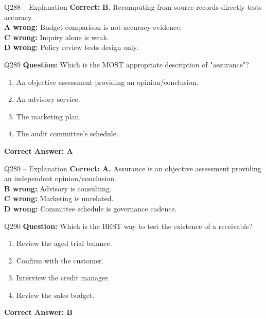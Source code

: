 \documentclass[aspectratio=169,10pt]{beamer}
\begin{document}
	\begin{frame}[t]{Q288 -- Explanation}
		\small
		\textbf{Correct: B.} Recomputing from source records directly tests accuracy. \\[4pt]
		\textbf{A wrong:} Budget comparison is not accuracy evidence. \\[2pt]
		\textbf{C wrong:} Inquiry alone is weak. \\[2pt]
		\textbf{D wrong:} Policy review tests design only.
	\end{frame}
	
	\begin{frame}[t]{Q289}
		\small
		\textbf{Question:} Which is the MOST appropriate description of "assurance"?
		\begin{enumerate}[label=\Alph*.,itemsep=1pt,topsep=2pt]
			\item An objective assessment providing an opinion/conclusion.
			\item An advisory service.
			\item The marketing plan.
			\item The audit committee's schedule.
		\end{enumerate}
		\vspace{4pt}
		\textbf{Correct Answer: A}
	\end{frame}
	
	\begin{frame}[t]{Q289 -- Explanation}
		\small
		\textbf{Correct: A.} Assurance is an objective assessment providing an independent opinion/conclusion. \\[4pt]
		\textbf{B wrong:} Advisory is consulting. \\[2pt]
		\textbf{C wrong:} Marketing is unrelated. \\[2pt]
		\textbf{D wrong:} Committee schedule is governance cadence.
	\end{frame}
	
	\begin{frame}[t]{Q290}
		\small
		\textbf{Question:} Which is the BEST way to test the existence of a receivable?
		\begin{enumerate}[label=\Alph*.,itemsep=1pt,topsep=2pt]
			\item Review the aged trial balance.
			\item Confirm with the customer.
			\item Interview the credit manager.
			\item Review the sales budget.
		\end{enumerate}
		\vspace{4pt}
		\textbf{Correct Answer: B}
	\end{frame}
	
\end{document}
